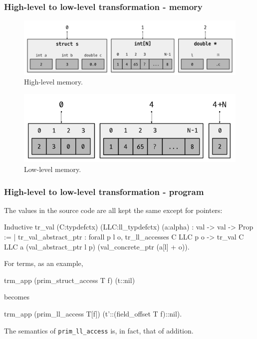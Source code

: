 \begin{frame}[fragile]
\frametitle{High-level to low-level transformation - memory}

\begin{center}

\begin{figure}
	\includegraphics[scale=0.31]{images/high_level_memory}
	\caption{High-level memory.}
\end{figure}

\begin{figure}
	\includegraphics[scale=0.31]{images/low_level_memory}
	\caption{Low-level memory.}
\end{figure}

\end{center}

\end{frame}


\begin{frame}[fragile]
\frametitle{High-level to low-level transformation - program}

The values in the source code  are all kept the same except for pointers:

\begin{coqs}
Inductive tr_val (C:typdefctx) (LLC:ll_typdefctx) (a:alpha) : val -> val -> Prop :=
	| tr_val_abstract_ptr : forall p l o,
      	tr_ll_accesses C LLC p o ->
      	tr_val C LLC a (val_abstract_ptr l p) (val_concrete_ptr (a[l] + o)).
\end{coqs}

\bigskip

For terms, as an example,

\begin{coqs}
  trm_app (prim_struct_access T f) (t::nil)
\end{coqs}

becomes

\begin{coqs}
  trm_app (prim_ll_access T[f]) (t'::(field_offset T f)::nil).
\end{coqs}

\bigskip

The semantics of \texttt{prim\_ll\_access} is, in fact, that of addition.

\end{frame}


